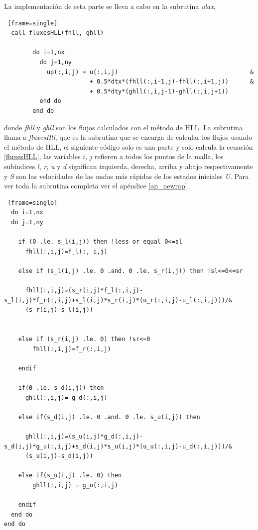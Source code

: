 \documentclass[12pt,a4paper]{book}
\begin{document}
La implementación de esta parte se lleva a cabo en la subrutina \emph{ulax},

\begin{lstlisting} [frame=single]
  call fluxesHLL(fhll, ghll)
      
        do i=1,nx
          do j=1,ny
            up(:,i,j) = u(:,i,j)                                     &
                        + 0.5*dtx*(fhll(:,i-1,j)-fhll(:,i+1,j))      &
                        + 0.5*dty*(ghll(:,i,j-1)-ghll(:,i,j+1))
          end do
        end do

\end{lstlisting}

\noindent donde \emph{fhll} y \emph{ghll} son los flujos calculados con el método de HLL.
La subrutina llama a \emph{fluxesHll}, que es la subrutina que se encarga de calcular los flujos usando el método de HLL, el siguiente código solo es una parte
y solo calcula la ecuación \ref{fluxesHLL}, las variables $i$, $j$ refieren a todos los puntos de la malla, los subíndices \emph{l}, \emph{r}, \emph{u} y \emph{d}
significan izquierda, derecha, arriba y abajo respectivamente y \emph{S} son las velocidades de las ondas más rápidas de los estados iniciales \emph{U}. Para ver toda la subrutina completa ver el apéndice \ref{ap_newrap}.

\begin{lstlisting} [frame=single]
  do i=1,nx
  do j=1,ny
    
    if (0 .le. s_l(i,j)) then !less or equal 0<=sl
      fhll(:,i,j)=f_l(:, i,j)

    else if (s_l(i,j) .le. 0 .and. 0 .le. s_r(i,j)) then !sl<=0<=sr
  
      fhll(:,i,j)=(s_r(i,j)*f_l(:,i,j)-s_l(i,j)*f_r(:,i,j)+s_l(i,j)*s_r(i,j)*(u_r(:,i,j)-u_l(:,i,j)))/&
      (s_r(i,j)-s_l(i,j))


    else if (s_r(i,j) .le. 0) then !sr<=0
        fhll(:,i,j)=f_r(:,i,j)

    endif

    if(0 .le. s_d(i,j)) then
      ghll(:,i,j)= g_d(:,i,j)

    else if(s_d(i,j) .le. 0 .and. 0 .le. s_u(i,j)) then

      ghll(:,i,j)=(s_u(i,j)*g_d(:,i,j)-s_d(i,j)*g_u(:,i,j)+s_d(i,j)*s_u(i,j)*(u_u(:,i,j)-u_d(:,i,j)))/&
      (s_u(i,j)-s_d(i,j))

    else if(s_u(i,j) .le. 0) then
        ghll(:,i,j) = g_u(:,i,j)

    endif
  end do
end do
\end{lstlisting}
\end{document}
